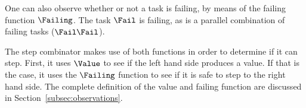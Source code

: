 One can also observe whether or not a task is failing, by means of the failing function $\Failing$.
The task $\Fail$ is failing, as is a parallel combination of failing tasks ($\Fail \And \Fail$).

The step combinator makes use of both functions in order to determine if it can step.
First, it uses $\Value$ to see if the left hand side produces a value.
If that is the case, it uses the $\Failing$ function to see if it is safe to step to the right hand side.
The complete definition of the value and failing function are discussed in Section~\ref{subsec:observations}.

